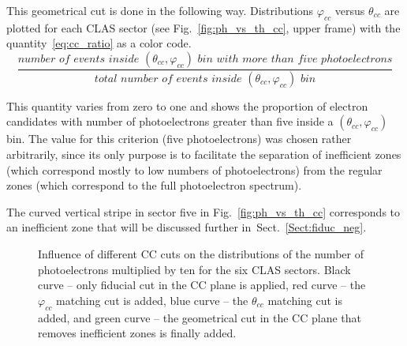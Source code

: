 This geometrical cut is done in the following way. Distributions $\varphi_{cc}$ versus $\theta_{cc}$ are plotted for each CLAS sector (see Fig.~\ref{fig:ph_vs_th_cc}, upper frame) with the quantity~\eqref{eq:cc_ratio} as a color code. 
\begin{equation}
\frac{number\,\, of\,\, events\,\,  inside\,\, (\theta_{cc},\varphi_{cc})\,\, bin\,\, with\,\, more\,\, than\,\, five\,\, photoelectrons }{total\,\, number\,\, of\,\, events\,\,  inside\,\, (\theta_{cc},\varphi_{cc})\,\, bin}
\label{eq:cc_ratio}
\end{equation}%

This quantity varies from zero to one and shows the proportion of electron candidates with number of photoelectrons greater than five inside a $(\theta_{cc},\varphi_{cc})$ bin. The value for this criterion (five photoelectrons) was chosen rather arbitrarily, since its only purpose is to facilitate the separation of inefficient zones (which correspond mostly to low numbers of photoelectrons) from the regular zones (which correspond to the full photoelectron spectrum). 

The curved vertical stripe in sector five in Fig.~\ref{fig:ph_vs_th_cc} corresponds to an inefficient zone that will be discussed further in~Sect.~\ref{Sect:fiduc_neg}.

\begin{figure}[htp]
\begin{center}
\caption{\small Influence of different CC cuts on the distributions of the number of photoelectrons multiplied by ten for the six CLAS sectors. Black curve -- only fiducial cut in the CC plane is applied, red curve -- the $\varphi_{cc}$ matching cut is added, blue curve -- the $\theta_{cc}$ matching cut is added, and green curve -- the geometrical cut in the CC plane that removes inefficient zones is finally added.} \label{fig:nphe_all_seg}
\end{center}
\end{figure}

